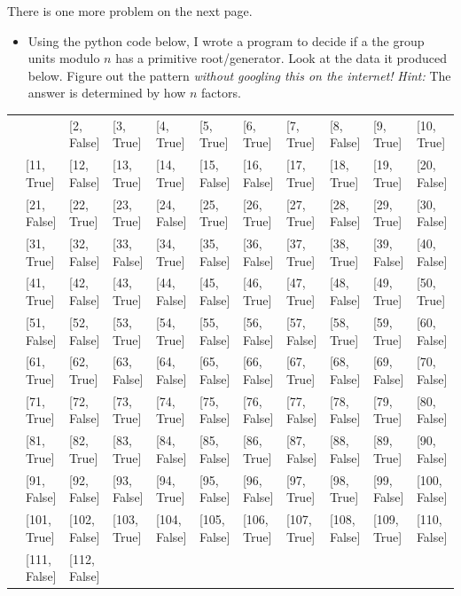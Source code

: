 \documentclass[11pt]{amsart}
\begin{document}
\vskip 24pt
There is one more problem on the next page.
\newpage
\begin{itemize}
\item[6.] Using the python code below, I wrote a program to decide if a the group units modulo $n$ has a primitive root/generator.  Look at the data it produced below.  Figure out the pattern \emph{without googling this on the internet!}
    \vskip 3pt
    \emph{Hint:} The answer is determined by how $n$ factors.  
    \end{itemize}
    {\scriptsize
    \begin{tabular}{lllllllllll}
    & &
[2, False] &
[3, True] &
[4, True] &
[5, True] &
[6, True] &
[7, True] &
[8, False] &
[9, True] &
[10, True] \\ &
[11, True] &
[12, False] &
[13, True] &
[14, True] &
[15, False] &
[16, False] &
[17, True] &
[18, True] &
[19, True] &
[20, False] \\ &
[21, False] &
[22, True] &
[23, True] &
[24, False] &
[25, True] &
[26, True] &
[27, True] &
[28, False] &
[29, True] &
[30, False] \\ &
[31, True] &
[32, False] &
[33, False] &
[34, True] &
[35, False] &
[36, False] &
[37, True] &
[38, True] &
[39, False] &
[40, False] \\ &
[41, True] &
[42, False] &
[43, True] &
[44, False] &
[45, False] &
[46, True] &
[47, True] &
[48, False] &
[49, True] &
[50, True] \\ &
[51, False] &
[52, False] &
[53, True] &
[54, True] &
[55, False] &
[56, False] &
[57, False] &
[58, True] &
[59, True] &
[60, False] \\ &
[61, True] &
[62, True] &
[63, False] &
[64, False] &
[65, False] &
[66, False] &
[67, True] &
[68, False] &
[69, False] &
[70, False] \\ &
[71, True] &
[72, False] &
[73, True] &
[74, True] &
[75, False] &
[76, False] &
[77, False] &
[78, False] &
[79, True] &
[80, False] \\ &
[81, True] &
[82, True] &
[83, True] &
[84, False] &
[85, False] &
[86, True] &
[87, False] &
[88, False] &
[89, True] &
[90, False] \\ &
[91, False] &
[92, False] &
[93, False] &
[94, True] &
[95, False] &
[96, False] &
[97, True] &
[98, True] &
[99, False] &
[100, False] \\ &
[101, True] &
[102, False] &
[103, True] &
[104, False] &
[105, False] &
[106, True] &
[107, True] &
[108, False] &
[109, True] &
[110, False] \\ &
[111, False] &
[112, False] &

\end{tabular}}
\end{document}
